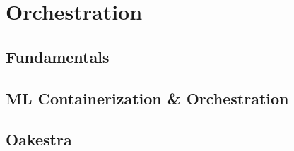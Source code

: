 
\section{Orchestration}

\subsection{Fundamentals}

\subsection{ML Containerization \& Orchestration}



\subsection{Oakestra}
